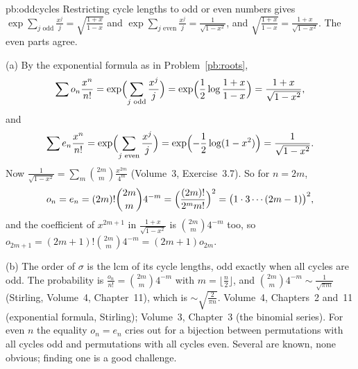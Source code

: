 \begin{solution}{pb:oddcycles}
\idea Restricting cycle lengths to odd or even numbers gives $\exp\sum_{j\text{ odd}}\frac{x^j}j=\sqrt{\frac{1+x}{1-x}}$ and
$\exp\sum_{j\text{ even}}\frac{x^j}j=\frac1{\sqrt{1-x^2}}$, and $\sqrt{\frac{1+x}{1-x}}=\frac{1+x}{\sqrt{1-x^2}}$. The even parts agree.

\writeup (a) By the exponential formula as in Problem~\ref{pb:roots},
\[
\sum o_n\frac{x^n}{n!}=\exp\Bigl(\sum_{j\text{ odd}}\frac{x^j}j\Bigr)=\exp\Bigl(\frac12\log\frac{1+x}{1-x}\Bigr)=\frac{1+x}{\sqrt{1-x^2}},
\]
and
\[
\sum e_n\frac{x^n}{n!}=\exp\Bigl(\sum_{j\text{ even}}\frac{x^j}j\Bigr)=\exp\Bigl(-\frac12\log(1-x^2)\Bigr)=\frac1{\sqrt{1-x^2}}.
\]
Now $\frac1{\sqrt{1-x^2}}=\sum_m\binom{2m}m\frac{x^{2m}}{4^m}$ (Volume~3, Exercise~3.7). So for $n=2m$,
\[
o_n=e_n=(2m)!\binom{2m}m4^{-m}=\Bigl(\frac{(2m)!}{2^mm!}\Bigr)^2=\bigl(1\cdot3\cdots(2m-1)\bigr)^2,
\]
and the coefficient of $x^{2m+1}$ in $\frac{1+x}{\sqrt{1-x^2}}$ is $\binom{2m}m4^{-m}$ too, so $o_{2m+1}=(2m+1)!\binom{2m}m4^{-m}=(2m+1)o_{2m}$.

(b) The order of $\sigma$ is the lcm of its cycle lengths, odd exactly when all cycles are odd. The probability is
$\frac{o_n}{n!}=\binom{2m}m4^{-m}$ with $m=\lfloor\frac n2\rfloor$, and $\binom{2m}m4^{-m}\sim\frac1{\sqrt{\pi m}}$ (Stirling, Volume~4,
Chapter~11), which is $\sim\sqrt{\frac2{\pi n}}$.
\tools Volume~4, Chapters~2 and~11 (exponential formula, Stirling); Volume~3, Chapter~3 (the binomial series).
\leads For even $n$ the equality $o_n=e_n$ cries out for a bijection between permutations with all cycles odd and permutations
with all cycles even. Several are known, none obvious; finding one is a good challenge.
\end{solution}

